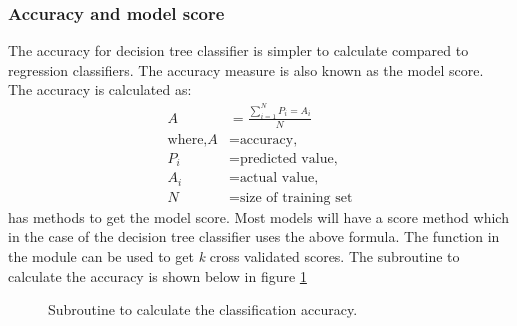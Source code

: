 \subsubsection{Accuracy and model score}
The accuracy for decision tree classifier is simpler to calculate compared to regression classifiers. The accuracy measure is also known as the model score. The accuracy is calculated as:
\begin{align*}
	A&=\frac{\sum^N_{i=1}P_i=A_i}{N}\\
	\text{where,}A&=\text{accuracy,}\\
	P_i&=\text{predicted value,}\\
	A_i&=\text{actual value,}\\
	N&=\text{size of training set}
\end{align*}
 has methods to get the model score. Most models will have a score method which in the case of the decision tree classifier uses the above formula.\newline
The  function in the  module can be used to get \textit{k} cross validated scores. The subroutine to calculate the accuracy is shown below in figure \ref{fig:acu}
\begin{figure}[H]
	\centering
	\caption{Subroutine to calculate the classification accuracy.}
	\label{fig:acu}
\end{figure}

